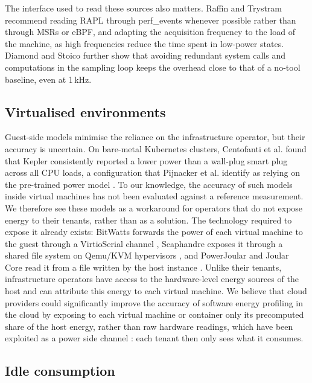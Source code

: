 \documentclass[
  acmsmall,
  screen,
  review,
  xcolor={dvipsnames,usenames}
]{acmart}
\begin{document}
The interface used to read these sources also matters. Raffin and Trystram \cite{raffinDissectingSoftwarebasedMeasurement2025} recommend reading RAPL through perf\_events whenever possible rather than through MSRs or eBPF, and adapting the acquisition frequency to the load of the machine, as high frequencies reduce the time spent in low-power states. Diamond and Stoico \cite{diamondWhatCostEnergy2026} further show that avoiding redundant system calls and computations in the sampling loop keeps the overhead close to that of a no-tool baseline, even at 1\,kHz.

\subsection{Virtualised environments}

Guest-side models minimise the reliance on the infrastructure operator, but their accuracy is uncertain. On bare-metal Kubernetes clusters, Centofanti et al. \cite{centofantiImpactPowerConsumption2024} found that Kepler consistently reported a lower power than a wall-plug smart plug across all CPU loads, a configuration that Pijnacker et al. identify as relying on the pre-trained power model \cite{pijnackerContainerlevelEnergyObservability2025}. To our knowledge, the accuracy of such models inside virtual machines has not been evaluated against a reference measurement. We therefore see these models as a workaround for operators that do not expose energy to their tenants, rather than as a solution. The technology required to expose it already exists: BitWatts forwards the power of each virtual machine to the guest through a VirtioSerial channel \cite{colmantProcesslevelPowerEstimation2015}, Scaphandre exposes it through a shared file system on Qemu/KVM hypervisors \cite{Scaphandre}, and PowerJoular and Joular Core read it from a file written by the host instance \cite{noureddinePowerJoularJoularJXMultiPlatform2022,JoularJoularcore2026}. Unlike their tenants, infrastructure operators have access to the hardware-level energy sources of the host and can attribute this energy to each virtual machine. We believe that cloud providers could significantly improve the accuracy of software energy profiling in the cloud by exposing to each virtual machine or container only its precomputed share of the host energy, rather than raw hardware readings, which have been exploited as a power side channel \cite{lippPLATYPUSSoftwarebasedPower2021}: each tenant then only sees what it consumes.

\subsection{Idle consumption}
\end{document}
